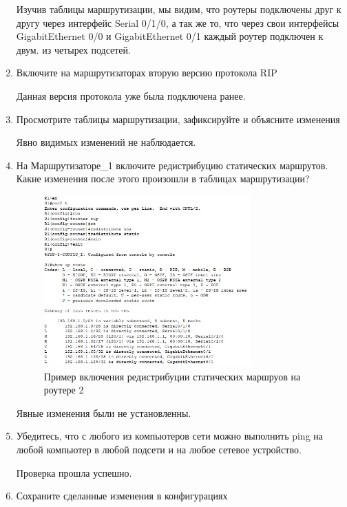 \documentclass[bachelor, och, labwork]{shiza}
\begin{document}
\begin{enumerate}
    Изучив таблицы маршрутизации, мы видим, что роутеры подключены друг к другу через интерфейс Serial 0/1/0,
    а так же то, что через свои интерфейсы GigabitEthernet 0/0 и GigabitEthernet 0/1 каждый роутер подключен к двум.
    из четырех подсетей.

    \item Включите на маршрутизаторах вторую версию протокола RIP
    
    Данная версия протокола уже была подключена ранее.

    \item Просмотрите таблицы маршрутизации, зафиксируйте и объясните изменения
    
    Явно видимых изменений не наблюдается.

    \item На Маршрутизаторе_1 включите редистрибуцию статических маршрутов. Какие изменения после этого произошли в таблицах маршрутизации?
    
    \begin{figure}[H]
        \centering      %
        \includegraphics[width=0.75\textwidth]{14}
        \caption{Пример включения редистрибуции статических маршруов на роутере 2}
        \label{fig:image1}
    \end{figure}

    Явные изменения были не установленны.

    \item Убедитесь, что с любого из компьютеров сети можно выполнить ping на любой компьютер в любой подсети и на любое сетевое устройство. 
    
    Проверка прошла успешно.

    \item Сохраните сделанные изменения в конфигурациях

\end{enumerate}
\end{document}
